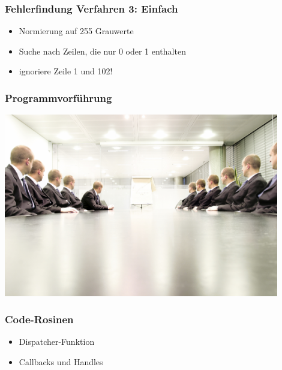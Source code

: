 \documentclass[12pt,a4paper]{beamer}
\begin{document}
\begin{frame}
	\frametitle{Fehlerfindung Verfahren 3: Einfach}
	\begin{itemize}
		\item Normierung auf 255 Grauwerte
		\item Suche nach Zeilen, die nur 0 oder 1 enthalten
		\item ignoriere Zeile 1 und 102!
	\end{itemize}
\end{frame}

\begin{frame}
	\frametitle{Programmvorf\"uhrung}
	\begin{center}
		\includegraphics[width=0.9\textwidth]{praesentation_stress.jpg} 
	\end{center}
\end{frame}

\begin{frame}
	\frametitle{Code-Rosinen}
	
	\begin{itemize}
		\item Dispatcher-Funktion
		\item Callbacks und Handles
	\end{itemize}
\end{frame}
\end{document}
